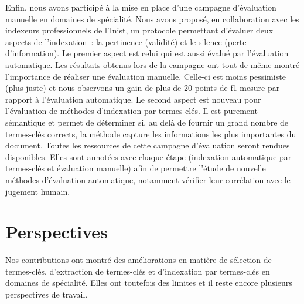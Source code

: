     Enfin, nous avons participé à la mise en place d'une campagne d'évaluation
    manuelle en domaines de spécialité. Nous avons proposé, en collaboration
    avec les indexeurs professionnels de l'Inist, un protocole permettant
    d'évaluer deux aspects de l'indexation~: la pertinence (validité) et le
    silence (perte d'information). Le premier aspect est celui qui est aussi
    évalué par l'évaluation automatique. Les résultats obtenus lors de la
    campagne ont tout de même montré l'importance de réaliser une évaluation
    manuelle. Celle-ci est moins pessimiste (plus juste) et nous observons un
    gain de plus de 20 points de f1-mesure par rapport à l'évaluation
    automatique. Le second aspect est nouveau pour
    l'évaluation de méthodes d'indexation par termes-clés. Il est purement
    sémantique et permet de déterminer si, au delà de fournir un grand nombre de
    termes-clés corrects, la méthode capture les informations les plus
    importantes du document. Toutes les ressources de cette campagne
    d'évaluation seront rendues disponibles. Elles sont annotées avec
    chaque étape (indexation automatique par termes-clés et évaluation manuelle)
    afin de permettre l'étude de nouvelle méthodes d'évaluation automatique,
    notamment vérifier leur corrélation avec le jugement humain.

  \section{Perspectives}
  \label{sec:main-conclusion-contributions}
    Nos contributions ont montré des améliorations en matière de sélection de
    termes-clés, d'extraction de termes-clés et d'indexation par termes-clés en
    domaines de spécialité. Elles ont toutefois des limites et il reste encore
    plusieurs perspectives de travail.

